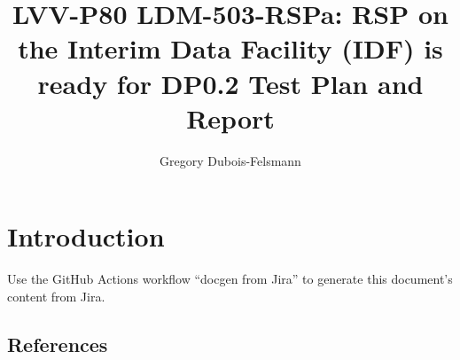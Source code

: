 \documentclass[DM,lsstdraft,toc]{lsstdoc}
\begin{document}
\def\milestoneName{LDM-503-RSPa: RSP on the Interim Data Facility (IDF) is ready for DP0.2}
\def\milestoneId{LVV-P80}
\def\product{Data Management}


\title{LVV-P80 LDM-503-RSPa: RSP on the Interim Data Facility (IDF) is ready for DP0.2 Test Plan and Report}
\setDocRef{\lsstDocType-\lsstDocNum}
\date{\vcsDate}
\author{Gregory Dubois-Felsmann}




\maketitle

\section{Introduction}
Use the GitHub Actions workflow ``docgen from Jira'' to generate this document's content from Jira.

\subsection{References}
\label{sect:references}
\renewcommand{\refname}{}




\end{document}
